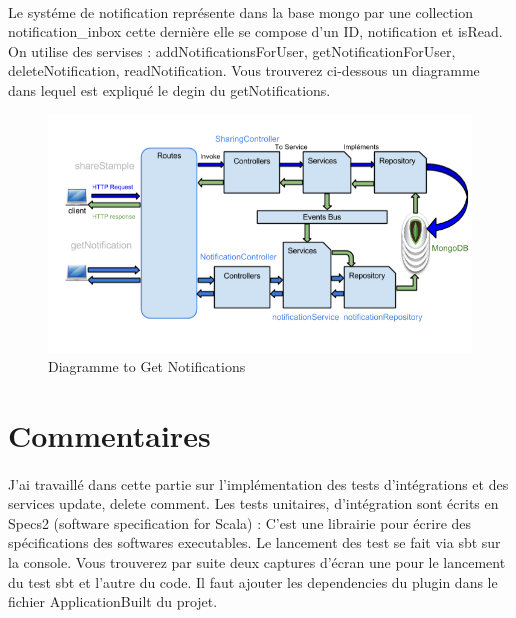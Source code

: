 \paragraph{}
Le systéme de notification représente dans la base mongo par une collection notification\_inbox cette dernière elle se compose d'un ID, notification et isRead.
On utilise des servises : addNotificationsForUser, getNotificationForUser, deleteNotification, readNotification.
Vous trouverez ci-dessous un diagramme dans lequel est expliqué le degin du getNotifications.
\begin{figure}[H]
        \centering
                \centering
                \includegraphics[width=\textwidth]{Notifications.png}
               \caption{Diagramme to Get Notifications}
		\label{fig:Diagramme to Get Notifications}
\end{figure}
\section{Commentaires}
\paragraph{}
J'ai travaillé dans cette partie sur l'implémentation des tests d'intégrations et des services update, delete comment.
Les tests unitaires, d'intégration sont écrits en Specs2 (software specification for Scala) : C'est une librairie pour écrire des spécifications des softwares executables. Le lancement des test se fait via sbt sur la console.
Vous trouverez par suite deux captures d'écran une pour le lancement du test sbt et l'autre du code.
Il faut ajouter les dependencies du plugin dans le fichier ApplicationBuilt du projet.

